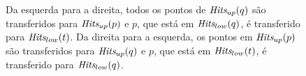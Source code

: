 \begin{figure}[h]
    \caption{Da esquerda para a direita,
        todos os pontos de $\textit{Hits}_{up}(q)$
        são transferidos para $\textit{Hits}_{up}(p)$
        e $p$, que está em $\textit{Hits}_{low}(q)$,
        é transferido para $\textit{Hits}_{low}(t)$.
        Da direita para a esquerda, os pontos
        em $\textit{Hits}_{up}(p)$ são transferidos
        para $\textit{Hits}_{up}(q)$ e $p$, que está
        em $\textit{Hits}_{low}(t)$, é transferido
        para $\textit{Hits}_{low}(q)$.}
    \label{fig:parcinetico:eventouptnaoexiste}
\end{figure}